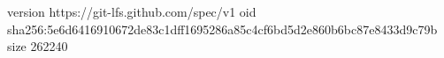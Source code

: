version https://git-lfs.github.com/spec/v1
oid sha256:5e6d6416910672de83c1dff1695286a85c4cf6bd5d2e860b6bc87e8433d9c79b
size 262240
